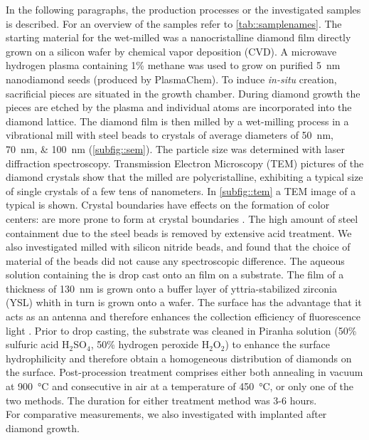 	In the following paragraphs, the production processes or the investigated samples is described. 
	For an overview of the samples refer to \autoref{tab::samplenames}.
	The starting material for the wet-milled \nds was a nanocristalline diamond film \cite{Williams2006a} directly grown on a silicon wafer by chemical vapor deposition (CVD). 
	A microwave hydrogen plasma containing 1\% methane was used to grow on purified \SI{5}{\nano\meter} nanodiamond seeds (produced by PlasmaChem).
	To induce \textit{in-situ} \siv creation, sacrificial \Si pieces are situated in the growth chamber.
	During diamond growth the \Si pieces are etched by the plasma and individual atoms are incorporated into the diamond lattice.
	The diamond film is then milled by a wet-milling process in a vibrational mill with steel beads to crystals of average diameters of \SIlist{50; 70; 100}{\nano\meter} (\autoref{subfig::sem}).
	The particle size was determined with laser diffraction spectroscopy.
	Transmission Electron Microscopy (TEM) pictures of the diamond crystals show that the milled \nds are polycristalline, exhibiting a typical size of single crystals of a few tens of nanometers.
	In \autoref{subfig::tem} a TEM image of a typical \nd is shown.
	Crystal boundaries have effects on the formation of color centers:
	\sivs are more prone to form at crystal boundaries \cite{Zapol2001}.
	The high amount of steel containment due to the steel beads is removed by extensive acid treatment.
	We also investigated \nds milled with silicon nitride beads, and found that the choice of material of the beads did not cause any spectroscopic difference.
	The aqueous solution containing the \nds is drop cast onto an \ir film on a \Si substrate.
	The \ir film of a thickness of \SI{130}{nm} is grown onto a buffer layer of yttria-stabilized zirconia (YSL) whith in turn is grown onto a \Si wafer.
	The \ir surface has the advantage that it acts as an antenna and therefore enhances the collection efficiency of fluorescence light \cite{Neu2012a}.
	Prior to drop casting, the substrate was cleaned in Piranha solution (50\% sulfuric acid H$_2$SO$_4$, 50\% hydrogen peroxide H$_2$O$_2$) to enhance the surface hydrophilicity and therefore obtain a homogeneous distribution of diamonds on the surface.
	Post-procession treatment comprises either both annealing in vacuum at \SI{900}{\degreeCelsius} and consecutive \ox in air at a temperature of \SI{450}{\degreeCelsius}, or only one of the two methods.
	The duration for either treatment method was 3-6 hours.
	\\
	For comparative measurements, we also investigated \nds with \sivs implanted after diamond growth. 
